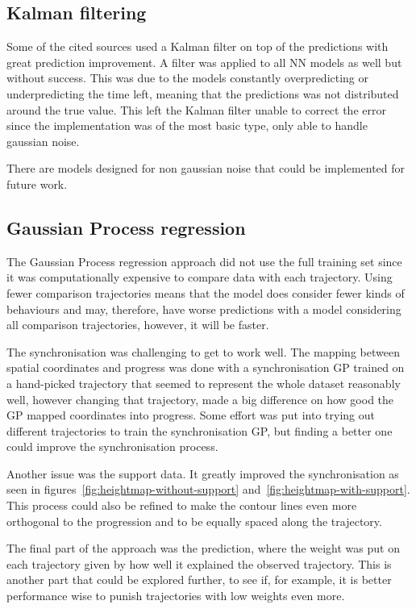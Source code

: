 \subsection{Kalman filtering}
Some of the cited sources used a Kalman filter on top of the predictions with great prediction improvement. A filter was applied to all NN models as well but without success. This was due to the models constantly overpredicting or underpredicting the time left, meaning that the predictions was not distributed around the true value. This left the Kalman filter unable to correct the error since the implementation was of the most basic type, only able to handle gaussian noise. 

There are models designed for non gaussian noise that could be implemented for future work.

\subsection{Gaussian Process regression}
The Gaussian Process regression approach did not use the full training set since it was computationally expensive to compare data with each trajectory. Using fewer comparison trajectories means that the model does consider fewer kinds of behaviours and may, therefore, have worse predictions with a model considering all comparison trajectories, however, it will be faster.

The synchronisation was challenging to get to work well. The mapping between spatial coordinates and progress was done with a synchronisation GP trained on a hand-picked trajectory that seemed to represent the whole dataset reasonably well, however changing that trajectory, made a big difference on how good the GP mapped coordinates into progress. Some effort was put into trying out different trajectories to train the synchronisation GP, but finding a better one could improve the synchronisation process.

Another issue was the support data. It greatly improved the synchronisation as seen in figures~\ref{fig:heightmap-without-support} and~\ref{fig:heightmap-with-support}. This process could also be refined to make the contour lines even more orthogonal to the progression and to be equally spaced along the trajectory. 

The final part of the approach was the prediction, where the weight was put on each trajectory given by how well it explained the observed trajectory. This is another part that could be explored further, to see if, for example, it is better performance wise to punish trajectories with low weights even more.

